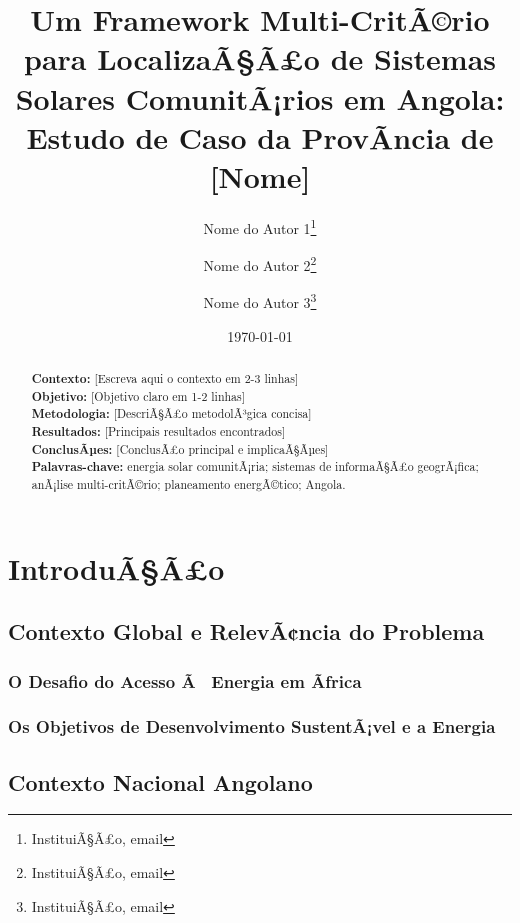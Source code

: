 \documentclass[12pt, a4paper]{article}
\begin{document}
\title{Um Framework Multi-CritÃ©rio para LocalizaÃ§Ã£o de Sistemas Solares ComunitÃ¡rios em Angola: Estudo de Caso da ProvÃ­ncia de [Nome]}
\author{
    Nome do Autor 1\thanks{InstituiÃ§Ã£o, email} \and 
    Nome do Autor 2\thanks{InstituiÃ§Ã£o, email} \and 
    Nome do Autor 3\thanks{InstituiÃ§Ã£o, email}
}
\date{\today}
\maketitle

\begin{abstract}
    \textbf{Contexto:} [Escreva aqui o contexto em 2-3 linhas] \\
    \textbf{Objetivo:} [Objetivo claro em 1-2 linhas] \\
    \textbf{Metodologia:} [DescriÃ§Ã£o metodolÃ³gica concisa] \\
    \textbf{Resultados:} [Principais resultados encontrados] \\
    \textbf{ConclusÃµes:} [ConclusÃ£o principal e implicaÃ§Ãµes] \\
    \textbf{Palavras-chave:} energia solar comunitÃ¡ria; sistemas de informaÃ§Ã£o geogrÃ¡fica; anÃ¡lise multi-critÃ©rio; planeamento energÃ©tico; Angola.
\end{abstract}

\newpage

\tableofcontents
\newpage

\section{IntroduÃ§Ã£o}
\subsection{Contexto Global e RelevÃ¢ncia do Problema}
\subsubsection{O Desafio do Acesso Ã  Energia em Ãfrica}
\subsubsection{Os Objetivos de Desenvolvimento SustentÃ¡vel e a Energia}

\subsection{Contexto Nacional Angolano}
\end{document}
